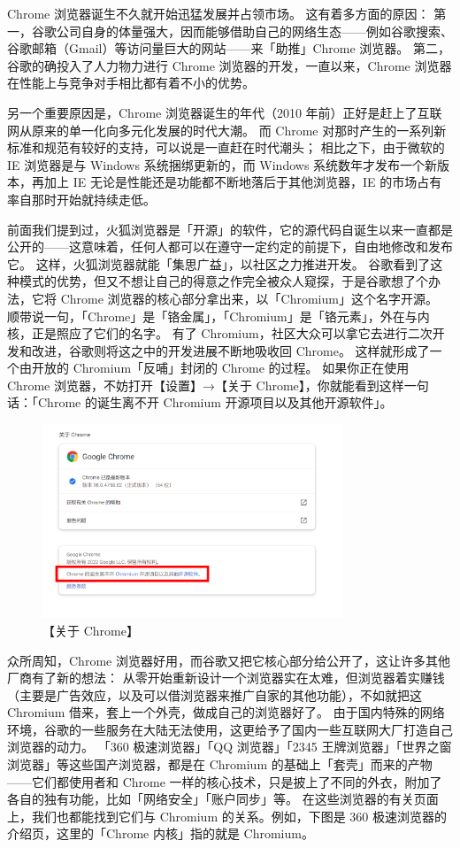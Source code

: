Chrome 浏览器诞生不久就开始迅猛发展并占领市场。
这有着多方面的原因：
第一，谷歌公司自身的体量强大，因而能够借助自己的网络生态——例如谷歌搜索、谷歌邮箱（Gmail）等访问量巨大的网站——来「助推」Chrome 浏览器。
第二，谷歌的确投入了人力物力进行 Chrome 浏览器的开发，一直以来，Chrome 浏览器在性能上与竞争对手相比都有着不小的优势。

\begin{note}
  另一个重要原因是，Chrome 浏览器诞生的年代（2010 年前）正好是赶上了互联网从原来的单一化向多元化发展的时代大潮。
  而 Chrome 对那时产生的一系列新标准和规范有较好的支持，可以说是一直赶在时代潮头；
  相比之下，由于微软的 IE 浏览器是与 Windows 系统捆绑更新的，而 Windows 系统数年才发布一个新版本，再加上 IE 无论是性能还是功能都不断地落后于其他浏览器，IE 的市场占有率自那时开始就持续走低。
\end{note}

前面我们提到过，火狐浏览器是「开源」的软件，它的源代码自诞生以来一直都是公开的——这意味着，任何人都可以在遵守一定约定的前提下，自由地修改和发布它。
这样，火狐浏览器就能「集思广益」，以社区之力推进开发。
谷歌看到了这种模式的优势，但又不想让自己的得意之作完全被众人窥探，于是谷歌想了个办法，它将 Chrome 浏览器的核心部分拿出来，以「Chromium」这个名字开源。
顺带说一句，「Chrome」是「铬金属」，「Chromium」是「铬元素」，外在与内核，正是照应了它们的名字。
有了 Chromium，社区大众可以拿它去进行二次开发和改进，谷歌则将这之中的开发进展不断地吸收回 Chrome。
这样就形成了一个由开放的 Chromium「反哺」封闭的 Chrome 的过程。
如果你正在使用 Chrome 浏览器，不妨打开【设置】→【关于 Chrome】，你就能看到这样一句话：「Chrome 的诞生离不开 Chromium 开源项目以及其他开源软件」。

\begin{figure}[htb!]
  \centering
  \includegraphics[width=9cm]{assets/About_chrome.png}
  \caption{【关于 Chrome】}
  \label{About_chrome}
\end{figure}

众所周知，Chrome 浏览器好用，而谷歌又把它核心部分给公开了，这让许多其他厂商有了新的想法：
从零开始重新设计一个浏览器实在太难，但浏览器着实赚钱（主要是广告效应，以及可以借浏览器来推广自家的其他功能），不如就把这 Chromium 借来，套上一个外壳，做成自己的浏览器好了。
由于国内特殊的网络环境，谷歌的一些服务在大陆无法使用，这更给予了国内一些互联网大厂打造自己浏览器的动力。
「360 极速浏览器」「QQ 浏览器」「2345 王牌浏览器」「世界之窗浏览器」等这些国产浏览器，都是在 Chromium 的基础上「套壳」而来的产物
——它们都使用者和 Chrome 一样的核心技术，只是披上了不同的外衣，附加了各自的独有功能，比如「网络安全」「账户同步」等。
在这些浏览器的有关页面上，我们也都能找到它们与 Chromium 的关系。例如，下图是 360 极速浏览器的介绍页，这里的「Chrome 内核」指的就是 Chromium。

